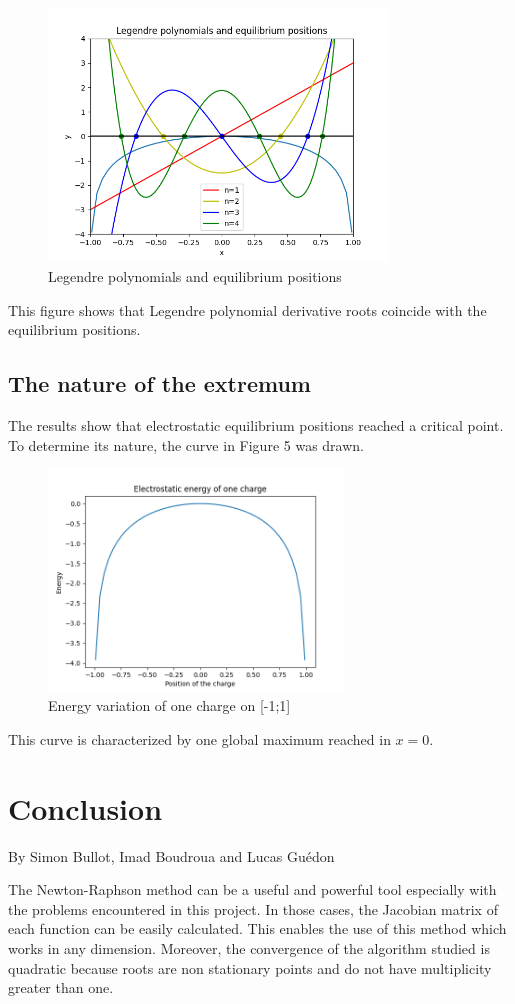 \documentclass{article}
\begin{document}
 
    \begin{figure}[!h]
    \centering
    \includegraphics[width=0.8\textwidth]{legendre_comparaison.png}
    \caption{Legendre polynomials and equilibrium positions}
\end{figure}

This figure shows that Legendre polynomial derivative roots coincide with the equilibrium positions.
\subsection{The nature of the extremum}
The results show that electrostatic equilibrium positions reached a critical point. To determine its nature, the curve in Figure 5 was drawn.
    \begin{figure}[!h]
    \centering
    \includegraphics[width=0.7\textwidth]{energy_position.png}
    \caption{Energy variation of one charge on  [-1;1]}

\end{figure}
\newpage
   This curve is characterized by one global maximum reached in $x=0$.
   
\section{Conclusion}
\begin{flushright}
By Simon Bullot, Imad Boudroua and Lucas Guédon
\end{flushright}

The Newton-Raphson method can be a useful and powerful tool especially with the problems encountered in this project. In those cases, the Jacobian matrix of each function can be easily calculated. This enables the use of this method which works in any dimension. Moreover, the convergence of the algorithm studied is quadratic because roots are non stationary points and do not have multiplicity greater than one.
\end{document}
